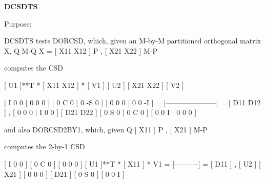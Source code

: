 {\bfseries D\+C\+S\+D\+T\+S} 

\begin{DoxyParagraph}{Purpose\+: }
\begin{DoxyVerb} DCSDTS tests DORCSD, which, given an M-by-M partitioned orthogonal
 matrix X,
              Q  M-Q
       X = [ X11 X12 ] P   ,
           [ X21 X22 ] M-P

 computes the CSD

       [ U1    ]**T * [ X11 X12 ] * [ V1    ]
       [    U2 ]      [ X21 X22 ]   [    V2 ]

                             [  I  0  0 |  0  0  0 ]
                             [  0  C  0 |  0 -S  0 ]
                             [  0  0  0 |  0  0 -I ]
                           = [---------------------] = [ D11 D12 ] ,
                             [  0  0  0 |  I  0  0 ]   [ D21 D22 ]
                             [  0  S  0 |  0  C  0 ]
                             [  0  0  I |  0  0  0 ]

 and also DORCSD2BY1, which, given
          Q
       [ X11 ] P   ,
       [ X21 ] M-P

 computes the 2-by-1 CSD

                                     [  I  0  0 ]
                                     [  0  C  0 ]
                                     [  0  0  0 ]
       [ U1    ]**T * [ X11 ] * V1 = [----------] = [ D11 ] ,
       [    U2 ]      [ X21 ]        [  0  0  0 ]   [ D21 ]
                                     [  0  S  0 ]
                                     [  0  0  I ]\end{DoxyVerb}
 
\end{DoxyParagraph}

